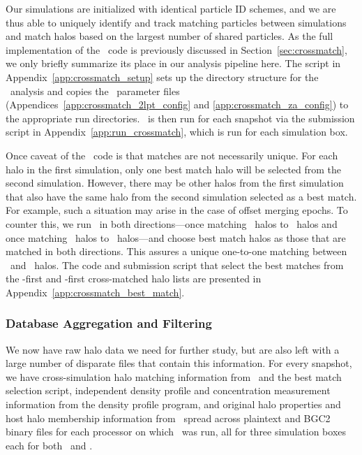 Our simulations are initialized with identical particle ID schemes, and we are thus able to uniquely identify and track matching particles between simulations and match halos based on the largest number of shared particles.  As the full implementation of the \crossmatch\ code is previously discussed in Section~\ref{sec:crossmatch}, we only briefly summarize its place in our analysis pipeline here.  The script in Appendix~\ref{app:crossmatch_setup} sets up the directory structure for the \crossmatch\ analysis and copies the \crossmatch\ parameter files (Appendices~\ref{app:crossmatch_2lpt_config} and \ref{app:crossmatch_za_config}) to the appropriate run directories.  \crossmatch\ is then run for each snapshot via the submission script in Appendix~\ref{app:run_crossmatch}, which is run for each simulation box.

Once caveat of the \crossmatch\ code is that matches are not necessarily unique.  For each halo in the first simulation, only one best match halo will be selected from the second simulation.  However, there may be other halos from the first simulation that also have the same halo from the second simulation selected as a best match.  For example, such a situation may arise in the case of offset merging epochs.  To counter this, we run \crossmatch\ in both directions---once matching \za\ halos to \lpt\ halos and once matching \lpt\ halos to \za\ halos---and choose best match halos as those that are matched in both directions.  This assures a unique one-to-one matching between \lpt\ and \za\ halos.  The code and submission script that select the best matches from the \lpt-first and \za-first cross-matched halo lists are presented in Appendix~\ref{app:crossmatch_best_match}.



\subsubsection{Database Aggregation and Filtering}
\label{subsubsec:analysis--catalog--aggregation}


We now have raw halo data we need for further study, but are also left with a large number of disparate files that contain this information.  For every snapshot, we have cross-simulation halo matching information from \crossmatch\ and the best match selection script, independent density profile and concentration measurement information from the density profile program, and original halo properties and host halo membership information from \rockstar\ spread across plaintext and BGC2 binary files for each processor on which \rockstar\ was run, all for three simulation boxes each for both \lpt\ and \za.

